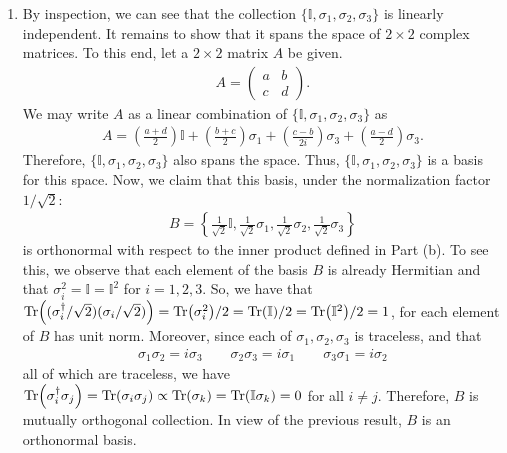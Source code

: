 \documentclass{article}
\theoremstyle{definition}
\newcommand{\f}[2]{\frac{#1}{#2}}
\newcommand{\lp}{\left(}
\newcommand{\rp}{\right)}
\newcommand{\lc}{\left\{}
\newcommand{\rc}{\right\}}
\begin{document}
\begin{enumerate}[label = (\alph*)]
	\item By inspection, we can see that the collection $\{ \mathbb{I}, \sigma_1,\sigma_2,\sigma_3\}$ is linearly independent. It remains to show that it spans the space of $2\times 2$ complex matrices. To this end, let a $2\times 2$ matrix $A$ be given. 
	\begin{align*}
	A = \begin{pmatrix}
	a & b \\ c & d
	\end{pmatrix}.
	\end{align*} 
	We may write $A$ as a linear combination of $\{ \mathbb{I}, \sigma_1, \sigma_2,\sigma_3 \}$ as 
	\begin{align*}
	A = \lp \f{a+d}{2} \rp \mathbb{I} + \lp \f{b+c}{2} \rp \sigma_1 + \lp \f{c-b}{2i} \rp \sigma_3 + \lp \f{a-d}{2} \rp \sigma_3.
	\end{align*}
	Therefore, $\{ \mathbb{I},\sigma_1,\sigma_2,\sigma_3 \}$ also spans the space. Thus, $\{ \mathbb{I}, \sigma_1,\sigma_2,\sigma_3 \}$ is a basis for this space. Now, we claim that this basis, under the normalization factor $1/\sqrt{2}$:
	\begin{align*}
	B = \lc \f{1}{\sqrt{2}}\mathbb{I}, \f{1}{\sqrt{2}}\sigma_1, \f{1}{\sqrt{2}}\sigma_2, \f{1}{\sqrt{2}}\sigma_3 \rc
	\end{align*}
	is orthonormal with respect to the inner product defined in Part (b). To see this, we observe that each element of the basis $B$ is already Hermitian and that $\sigma_i^2 = \mathbb{I} = \mathbb{I}^2$ for $i=1,2,3$. So, we have that $\Tr((\sigma_i^\dagger/\sqrt{2})( \sigma_i/\sqrt{2}) ) = \Tr(\sigma_i^2)/2 = \Tr(\mathbb{I})/2 = \Tr(\mathbb{I}^2)/2 = 1$, for each element of $B$ has unit norm. Moreover, since each of $\sigma_1,\sigma_2,\sigma_3$ is traceless, and that
	\begin{align*}
	\sigma_1\sigma_2 = i\sigma_3 \quad\quad \sigma_2\sigma_3 = i\sigma_1\quad\quad \sigma_3\sigma_1 = i\sigma_2
	\end{align*} 
	all of which are traceless, we have $\Tr(\sigma_i^\dagger \sigma_j)= \Tr(\sigma_i\sigma_j) \propto  \Tr(\sigma_k) = \Tr(\mathbb{I}\sigma_k) = 0$ for all $i\neq j$. Therefore, $B$ is mutually orthogonal collection. In view of the previous result, $B$ is an orthonormal basis. 
	

\end{enumerate}
\end{document}
